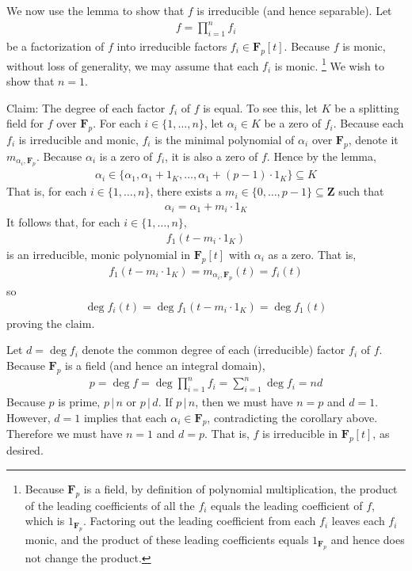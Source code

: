 \documentclass[oneside, english, 11pt]{article}
\newcommand{\fontField}[1]{\mathbf{#1}}
\newcommand{\divides}{\,|\,}
\newcommand{\F}{\fontField{F}}
\newcommand{\integers}{\fontField{Z}}
\newcommand{\Z}{\integers}
\begin{document}
We now use the lemma to show that $f$ is irreducible (and hence separable). Let
\begin{align*}
f
=
\prod_{i = 1}^{n} f_{i}
\end{align*}
be a factorization of $f$ into irreducible factors $f_{i} \in \F_{p}[t]$. Because $f$ is monic, without loss of generality, we may assume that each $f_{i}$ is monic.%
\footnote{Because $\F_{p}$ is a field, by definition of polynomial multiplication, the product of the leading coefficients of all the $f_{i}$ equals the leading coefficient of $f$, which is $1_{\F_{p}}$. Factoring out the leading coefficient from each $f_{i}$ leaves each $f_{i}$ monic, and the product of these leading coefficients equals $1_{\F_{p}}$ and hence does not change the product.} %
We wish to show that $n = 1$.

Claim: The degree of each factor $f_{i}$ of $f$ is equal. To see this, let $K$ be a splitting field for $f$ over $\F_{p}$. For each $i \in \{1, \ldots, n\}$, let $\alpha_{i} \in K$ be a zero of $f_{i}$. Because each $f_{i}$ is irreducible and monic, $f_{i}$ is the minimal polynomial of $\alpha_{i}$ over $\F_{p}$, denote it $m_{\alpha_{i}, \F_{p}}$. Because $\alpha_{i}$ is a zero of $f_{i}$, it is also a zero of $f$. Hence by the lemma,
\begin{align*}
\alpha_{i}
\in
\{\alpha_{1}, \alpha_{1} + 1_{K}, \ldots, \alpha_{1} + (p - 1) \cdot 1_{K}\}
\subseteq
K
\end{align*}
That is, for each $i \in \{1, \ldots, n\}$, there exists a $m_{i} \in \{0, \ldots, p - 1\} \subseteq \Z$ such that
\begin{align*}
\alpha_{i}
=
\alpha_{1} + m_{i} \cdot 1_{K}
\end{align*}
It follows that, for each $i \in \{1, \ldots, n\}$,
\begin{align*}
f_{1}(t - m_{i} \cdot 1_{K})
\end{align*}
is an irreducible, monic polynomial in $\F_{p}[t]$ with $\alpha_{i}$ as a zero. That is,
\begin{align*}
f_{1}(t - m_{i} \cdot 1_{K})
=
m_{\alpha_{i}, \F_{p}}(t)
=
f_{i}(t)
\end{align*}
so
\begin{align*}
\deg f_{i}(t)
=
\deg f_{1}(t - m_{i} \cdot 1_{K})
=
\deg f_{1}(t)
\end{align*}
proving the claim.

Let $d = \deg f_{i}$ denote the common degree of each (irreducible) factor $f_{i}$ of $f$. Because $\F_{p}$ is a field (and hence an integral domain),
\begin{align*}
p
=
\deg f
=
\deg \prod_{i = 1}^{n} f_{i}
=
\sum_{i = 1}^{n} \deg f_{i}
=
n d
\end{align*}
Because $p$ is prime, $p \divides n$ or $p \divides d$. If $p \divides n$, then we must have $n = p$ and $d = 1$. However, $d = 1$ implies that each $\alpha_{i} \in \F_{p}$, contradicting the corollary above. Therefore we must have $n = 1$ and $d = p$. That is, $f$ is irreducible in $\F_{p}[t]$, as desired.
\end{document}
